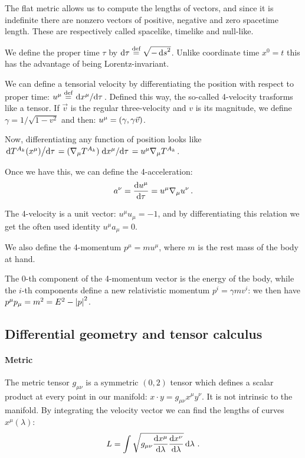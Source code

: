 \documentclass[main.tex]{subfiles}
\begin{document}
The flat metric allows us to compute the lengths of vectors, and since it is indefinite there are nonzero vectors of positive, negative and zero spacetime length. These are respectively called spacelike, timelike and null-like.

We define the proper time \(\tau\) by \(\dd{\tau} \stackrel{\text{def}}{=} \sqrt{-\dd{s}^2} \). Unlike coordinate time \(x^0 = t\) this has the advantage of being Lorentz-invariant.

We can define a tensorial velocity by differentiating the position with respect to proper time: \(u^\mu \stackrel{\text{def}}{=} \dv*{x^\mu}{\tau}\). Defined this way, the so-called 4-velocity trasforms like a tensor. If \(\vec{v}\) is the regular three-velocity and \(v\) is its magnitude, we define \(\gamma = 1/\sqrt{1-v^2} \) and then:
\(u^\mu = \qty(\gamma, \gamma \vec{v})\).

Now, differentiating any function of position looks like \(\dv*{T^{A_k}(x^\mu)}{\tau} = (\nabla_\mu T^{A_k}) \dv*{x^\mu}{\tau} = u^\mu \nabla_\mu T^{A_k} \).

Once we have this, we can define the 4-acceleration:
\begin{equation} \label{eq:covariant-acceleration-def}
    a^\nu = \dv{u^\mu}{\tau}  = u^\mu \nabla_\mu u^\nu \,.
\end{equation}

The 4-velocity is a unit vector: \(u^\mu u_\mu = -1\), and by differentiating this relation we get the often used identity \(u^\mu a_\mu = 0\).

We also define the 4-momentum \(p^\mu = m u^\mu\), where \(m\) is the rest mass of the body at hand.

The 0-th component of the 4-momentum vector is the energy of the body, while the $i$-th components define a new relativistic momentum \(p^i = \gamma m v^i\): we then have $p^\mu p_\mu = m^2 = E^2 - \abs{p}^2$.

\subsection{Differential geometry and tensor calculus}

\paragraph{Metric}

The metric tensor \(g_{\mu\nu}\) is a symmetric \((0,2)\) tensor which defines a scalar product at every point in our manifold: \(x \cdot y = g_{\mu\nu} x^\mu y^\nu\).
It is not intrinsic to the manifold.
By integrating the velocity vector we can find the lengths of curves \(x^\mu(\lambda)\):
\begin{equation}
    L = \int \sqrt{g_{\mu\nu} \dv{x^\mu}{\lambda} \dv{x^\nu}{\lambda} }  \dd{\lambda} \,.
\end{equation}
\end{document}
